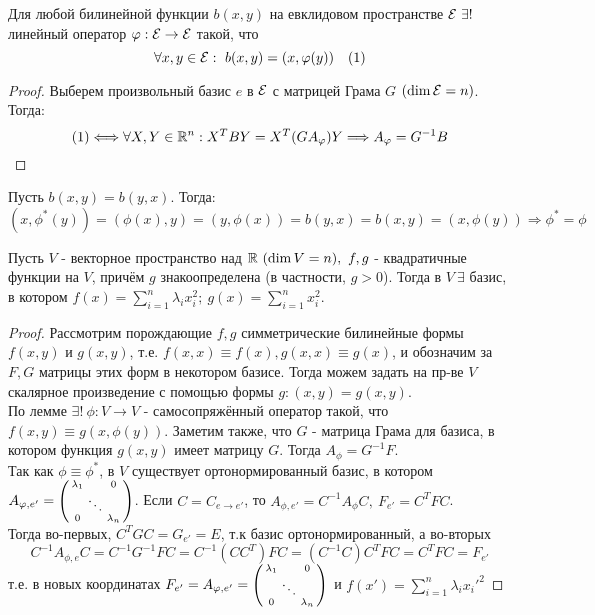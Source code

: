 \begin{lemma}
    Для любой билинейной функции $b(x, y)$ на евклидовом пространстве $\E \ \exists!$ линейный оператор $\varphi: \mathcal{E} \rightarrow \mathcal{E}$ такой, что
    $$\forall x, y \in \mathcal{E}: \ b(x, y) = (x, \varphi(y)) \ \ \ (1)$$
\end{lemma}
\begin{proof}
    Выберем произвольный базис $e$ в $\mathcal{E}$ с матрицей Грама $G$ $(\dim \mathcal{E} = n)$. Тогда:
    $$(1) \Longleftrightarrow \forall X, Y \in \mathbb{R}^n: X^TBY = X^T(GA_{\varphi})Y \Longrightarrow A_\varphi = G^{-1}B$$ 
\end{proof}
\begin{remark}
    Пусть $b(x, y) = b(y, x)$. Тогда:
    $$(x, \phi^*(y)) = (\phi(x), y) = (y, \phi(x)) = b(y, x) = b(x, y) = (x, \phi(y)) \Rightarrow \phi^* = \phi$$
\end{remark}
\begin{theorem}
    Пусть $V$ - векторное пространство над $\mathbb{R} \ (\dim V = n), \ f, g$ - квадратичные функции на $V$, причём $g$ знакоопределена (в частности, $g > 0$). Тогда в $V \ \exists$ базис, в котором $f(x) = \sum \limits_{i=1}^n \lambda_i x_i^2; \ g(x) = \sum \limits_{i=1}^n x_i^2$. 
\end{theorem}
\begin{proof}
    Рассмотрим порождающие $f, g$ симметрические билинейные формы $f(x, y)$ и $g(x, y)$, т.е. $f(x,x) \equiv f(x), g(x, x) \equiv g(x)$, и обозначим за $F,G$ матрицы этих форм в некотором базисе. Тогда можем задать на пр-ве $V$ скалярное произведение с помощью формы $g: (x,y) = g(x,y)$.\\
    По лемме $\exists! \ \phi: V\rightarrow V$ - самосопряжённый оператор такой, что $f(x, y) \equiv g(x, \phi(y))$. Заметим также, что $G$ - матрица Грама для базиса, в котором функция $g(x, y)$ имеет матрицу $G$. Тогда $A_\phi = G^{-1}F$.\\
    Так как $\phi \equiv \phi^*$, в $V$ существует ортонормированный базис, в котором $A_{\phi, e'} = \begin{psmallmatrix}  \lambda_1&\null&0 \\ \null&\ddots&\null \\ 0&\null&\lambda_n \end{psmallmatrix}$. Если $C = C_{e\rightarrow e'}$, то $A_{\phi, e'} = C^{-1}A_\phi C, \ F_{e'} = C^TFC$.\\
    Тогда во-первых, $C^TGC = G_{e'} = E$, т.к базис ортонормированный, а во-вторых
    $$C^{-1}A_{\phi, e}C = C^{-1}G^{-1}FC = C^{-1}(CC^T)FC = (C^{-1}C)C^TFC = C^TFC = F_{e'}$$
    т.е. в новых координатах $F_{e'} = A_{\phi, e'} = \begin{psmallmatrix}  \lambda_1&\null&0 \\ \null&\ddots&\null \\ 0&\null&\lambda_n \end{psmallmatrix}$ и $f(x') = \sum \limits_{i=1}^n \lambda_i {x_i'}^2$
\end{proof}
